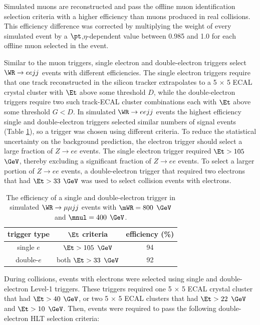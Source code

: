 Simulated muons are reconstructed and pass the offline muon identification selection criteria with a higher 
efficiency than muons produced in real collisions.  This efficiency difference was corrected by multiplying the weight of every 
simulated event by a $\pt$,$\eta$-dependent value between 0.985 and 1.0 for each offline muon selected in the event.


Similar to the muon triggers, single electron and double-electron triggers select $\WR \rightarrow eejj$ events with different efficiencies.  
The single electron triggers require that one track reconstructed in the silicon tracker extrapolates to a 5 $\times$ 5 ECAL crystal 
cluster with $\Et$ above some threshold $D$, while the double-electron triggers require two such track-ECAL cluster combinations each 
with $\Et$ above some threshold $G < D$.  In simulated $\WR \rightarrow eejj$ events the highest efficiency single and double-electron 
triggers selected similar numbers of signal events (Table \ref{tab:singleVsDblEleHlt}), so a trigger was chosen using different criteria.  To 
reduce the statistical uncertainty on the \DY background prediction, the electron trigger should select a large fraction of $Z \rightarrow ee$ 
events.  The single electron trigger required $\Et > 105$ $\GeV$, thereby excluding a significant fraction of $Z \rightarrow ee$ events.  To 
select a larger portion of $Z \rightarrow ee$ events, a double-electron trigger that required two electrons that had $\Et > 33$ $\GeV$ 
was used to select collision events with electrons.

\begin{table}[h]
	\caption{The efficiency of a single and double-electron trigger in simulated $\WR \rightarrow \mu\mu jj$ events with $\mWR = 800$ $\GeV$ 
		and $\mnul = 400$ $\GeV$.}
	\label{tab:singleVsDblEleHlt}
	\centering
	\begin{tabular}{c|c|c}
		trigger type & $\Et$ criteria & efficiency (\%) \\  \hline
		single $e$ & $\Et >105$ $\GeV$ & 94  \\ 
		double-$e$ & both $\Et >33$ $\GeV$ & 92  \\
	\end{tabular}
\end{table}

During collisions, events with electrons were selected using single and double-electron Level-1 triggers.  These triggers required 
one 5 $\times$ 5 ECAL crystal cluster that had $\Et > 40$ $\GeV$, or two 5 $\times$ 5 ECAL clusters that had 
$\Et > 22$ $\GeV$ and $\Et > 10$ $\GeV$.  Then, events were required to pass the following double-electron HLT selection criteria:

